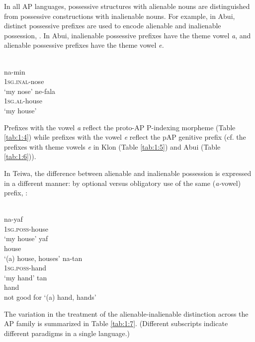 {In all AP languages, possessive structures with alienable nouns are distinguished from possessive constructions with inalienable nouns. For example, in Abui, distinct possessive prefixes are used to encode alienable and inalienable possession, . In Abui, inalienable possessive prefixes have the theme vowel \textit{a}, and alienable possessive prefixes have the theme vowel \textit{e.}



\ea%
\label{ex:1:22}
 \\
\ea
\gll na-min \\
 1\textsc{sg.inal}{}-nose   \\
\glt `my nose'  
\ex
\gll ne-fala \\
  \textsc{1sg.al}{}-house     \\
\glt  `my house'  
\z
\z
 

Prefixes with the vowel \textit{a} reflect the proto-AP P-indexing morpheme (Table \ref{tab:1:4}) while prefixes with the vowel \textit{e} reflect the pAP genitive prefix (cf. the prefixes with theme vowels \textit{e} in Klon (Table \ref{tab:1:5}) and Abui (Table \ref{tab:1:6})). 

In Teiwa, the difference between alienable and inalienable possession is expressed in a different manner: by optional versus obligatory use of the same (\textit{a-}vowel) prefix, :



\ea%
\label{ex:1:23}
 \\
\ea
\gll na-yaf \\
  \textsc{1sg.poss-}house  \\
\glt `my house' 
\ex
\gll yaf \\
  house   \\
\glt    `(a) house, houses'
\ex
\gll na-tan \\
  \textsc{1sg.poss-}hand   \\
\glt `my hand' 
\ex
\gll tan \\
  hand \\
\glt  not good for `(a) hand, hands'
\z\z
 

  

The variation in the treatment of the alienable-inalienable distinction across the AP family is summarized in Table \ref{tab:1:7}. (Different subscripts indicate different paradigms in a single language.) 

}
